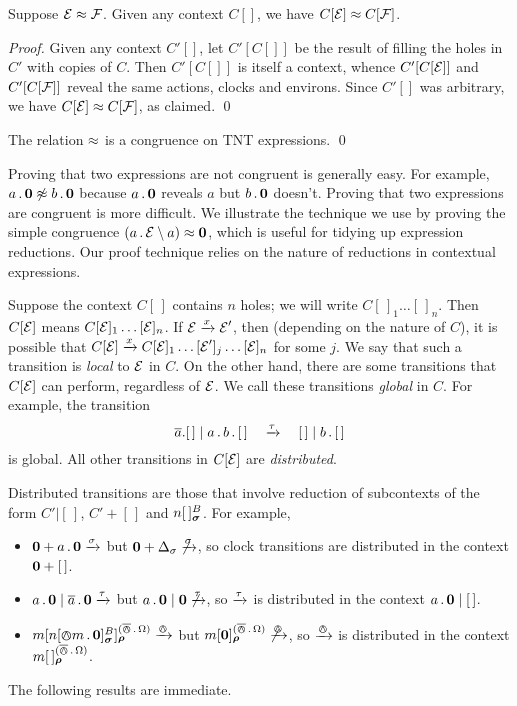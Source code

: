 \documentclass[orivec,envcountsame]{llncs}
\begin{document}
\begin{proposition}
\label{prop:context-substitution} 
Suppose $\text{$\mathcal{E}$} \approx \text{$\mathcal{F}$}$. Given any context $C[]$, we have $C[\text{$\mathcal{E}$}]
\approx C[\text{$\mathcal{F}$}]$.
\end{proposition}
\begin{proof}
Given any context $C'[]$, let $C'[C[]]$ be the result of filling the
holes in $C'$ with copies of $C$. Then $C'[C[]]$ is itself a context,
whence $C'[C[\text{$\mathcal{E}$}]]$ and $C'[C[\text{$\mathcal{F}$}]]$ reveal the same actions,
clocks and environs. Since $C'[]$ was arbitrary, we have $C[\text{$\mathcal{E}$}] \approx
C[\text{$\mathcal{F}$}]$, as claimed.
\qed \end{proof}

\begin{theorem}
The relation $\approx$ is a congruence on TNT expressions. \qed
\end{theorem}



Proving that two expressions are not congruent is generally easy. For
example, $a\,.\,\textbf{0} \not\approx b\,.\,\textbf{0}$ because $a\,.\,\textbf{0}$ reveals $a$
but $b\,.\,\textbf{0}$ doesn't. Proving that two expressions are congruent is
more difficult. We illustrate the technique we use by proving the simple
congruence $\left(a\,.\,\text{$\mathcal{E}$} \setminus {a}\right) \approx \textbf{0}$, which is useful
for tidying up expression reductions. Our proof technique relies on the
nature of reductions in contextual expressions.

Suppose the context $C[\,]$ contains $n$ holes; we will write
$C[\,]_1\dots[\,]_n$. Then $C[\text{$\mathcal{E}$}]$ means $C[\text{$\mathcal{E}$}]_1\dots[\text{$\mathcal{E}$}]_n$. If
$\text{$\mathcal{E}$} \xrightarrow{x} \text{$\mathcal{E}$}'$, then (depending on the nature of $C$), it is possible
that $C[\text{$\mathcal{E}$}] \xrightarrow{x} C[\text{$\mathcal{E}$}]_1\dots[\text{$\mathcal{E}$}']_j\dots[\text{$\mathcal{E}$}]_n$ for some $j$.
We say that such a transition is \emph{local} to $\text{$\mathcal{E}$}$ in $C$. On the other
hand, there are some transitions that $C[\text{$\mathcal{E}$}]$ can perform, regardless of
$\text{$\mathcal{E}$}$. We call these transitions \emph{global} in $C$. For example, the
transition \[ \overline{a}.[\,] \mid a \,.\, b \,.\, [\,] \quad\xrightarrow{\tau}\quad [\,]
\mid b \,.\, [\,] \] is global. All other transitions in $C[\text{$\mathcal{E}$}]$ are
\emph{distributed}.

Distributed transitions are those that involve reduction of subcontexts of the
form $C'|[\,]$, $C' + [\,]$ and $\locv{n}{\,}{B}{\vec{\sigma}}$. For example,

\begin{itemize}
\item
    $\textbf{0} + a\,.\,\textbf{0} \xrightarrow{\sigma}$ but $\textbf{0} + \Delta_\sigma
     \not\xrightarrow{\sigma}$, so clock transitions are distributed in the
     context $\textbf{0} + [\,]$.
\item
    $a\,.\,\textbf{0} \mid \overline{a}\,.\,\textbf{0} \xrightarrow{\tau}$ but $a\,.\,\textbf{0} \mid
     \textbf{0} \not\xrightarrow{\tau}$, so $\xrightarrow{\tau}$ is distributed in the
     context $a\,.\,\textbf{0} \mid [\,]$.
\item
    $\locv{m}{ \locv{n}{\tntout{m}\pref\nil}{B}{\vec{\sigma}}}%
     {(\bout\pref\Omega)}{\vec{\rho}} \Does{\tout}$ but
    $\locv{m}{ \nil }{(\bout\pref\Omega)}{\vec{\rho}} \not\Does{\tout}$,
     so $\xrightarrow{\varowedge}$ is distributed in the context $\locv{m}{\,}%
     {(\bout\pref\Omega)}{\vec{\rho}}$.
\end{itemize}
The following results are immediate.
\end{document}
